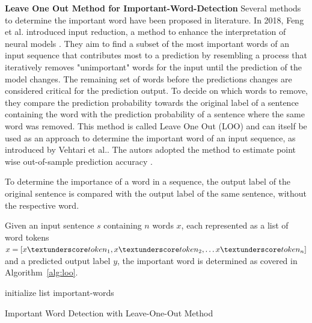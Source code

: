         \textbf{Leave One Out Method for Important-Word-Detection}
            Several methods to determine the important word have been proposed in literature.
            In 2018, Feng et al. introduced input reduction, a method to enhance the interpretation of neural models \cite{feng2018pathologies}. They aim to find a subset of the most important words of an input sequence that contributes most to a prediction by resembling a process that iteratively removes "unimportant" words for the input until the prediction of the model changes. The remaining set of words before the predictions changes are considered critical for the prediction output. To decide on which words to remove, they compare the prediction probability towards the original label of a sentence containing the word with the prediction probability of a sentence where the same word was removed. This method is called Leave One Out (LOO) and can itself be used as an approach to determine the important word of an input sequence, as introduced by Vehtari et al.. The autors adopted the method to estimate point wise out-of-sample prediction accuracy \cite{vehtari2017practical}. 

            To determine the importance of a word in a sequence, the output label of the original sentence is compared with the output label of the same sentence, without the respective word. 
             
            Given an input sentence $s$ containing $n$ words $x$, each represented as a list of word tokens 
            ${x = [x\textunderscore token_1, x\textunderscore token_2, \dots x\textunderscore token_n]}$ and a predicted output label $y$, the important word is determined as covered in Algorithm~\ref{alg:loo}. 

            \IncMargin{1em}
            \begin{algorithm}[H]
            \SetAlgoLined
            \DontPrintSemicolon
            \Indm 
            \Indp
            initialize list important-words\;
            \caption{Important Word Detection with Leave-One-Out Method}
            \label{alg:loo}
            \end{algorithm}
            \DecMargin{1em}


